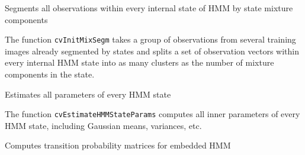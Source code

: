 
Segments all observations within every internal state of HMM by state mixture components


\begin{description}
\end{description}

The function \texttt{cvInitMixSegm} takes a group of observations from several training images already segmented by states and splits a set of observation vectors within every internal HMM state into as many clusters as the number of mixture components in the state.


Estimates all parameters of every HMM state


\begin{description}
\end{description}

The function \texttt{cvEstimateHMMStateParams} computes all inner parameters of every HMM state, including Gaussian means, variances, etc.


Computes transition probability matrices for embedded HMM


\begin{description}
\end{description}

